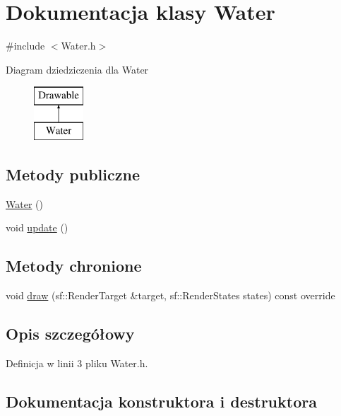\hypertarget{class_water}{}\section{Dokumentacja klasy Water}
\label{class_water}


{\ttfamily \#include $<$Water.\+h$>$}

Diagram dziedziczenia dla Water\begin{figure}[H]
\begin{center}
\leavevmode
\includegraphics[height=2.000000cm]{class_water}
\end{center}
\end{figure}
\subsection*{Metody publiczne}
\begin{DoxyCompactItemize}
\item 
\mbox{\hyperlink{class_water_a32d8f391b149a405008a606ceafa35ee}{Water}} ()
\item 
void \mbox{\hyperlink{class_water_a18fce2c0b2c45ee4ea8e413fcb4bdafa}{update}} ()
\end{DoxyCompactItemize}
\subsection*{Metody chronione}
\begin{DoxyCompactItemize}
\item 
void \mbox{\hyperlink{class_water_a4a929b9c339c55d6c7bcabe79349bae8}{draw}} (sf\+::\+Render\+Target \&target, sf\+::\+Render\+States states) const override
\end{DoxyCompactItemize}


\subsection{Opis szczegółowy}


Definicja w linii 3 pliku Water.\+h.



\subsection{Dokumentacja konstruktora i destruktora}
\mbox{\label{class_water_a32d8f391b149a405008a606ceafa35ee}} 
